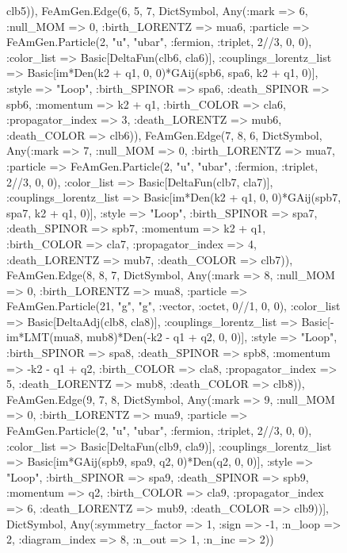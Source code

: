 \documentclass{revtex4}
\begin{document}
\begin{figure}[!htb]
\begin{center}
{clb5)), FeAmGen.Edge(6, 5, 7, Dict{Symbol, Any}(:mark => 6, :null_MOM => 0, :birth_LORENTZ => mua6, :particle => FeAmGen.Particle(2, "u", "ubar", :fermion, :triplet, 2//3, 0, 0), :color_list => Basic[DeltaFun(clb6, cla6)], :couplings_lorentz_list => Basic[im*Den(k2 + q1, 0, 0)*GAij(spb6, spa6, k2 + q1, 0)], :style => "Loop", :birth_SPINOR => spa6, :death_SPINOR => spb6, :momentum => k2 + q1, :birth_COLOR => cla6, :propagator_index => 3, :death_LORENTZ => mub6, :death_COLOR => clb6)), FeAmGen.Edge(7, 8, 6, Dict{Symbol, Any}(:mark => 7, :null_MOM => 0, :birth_LORENTZ => mua7, :particle => FeAmGen.Particle(2, "u", "ubar", :fermion, :triplet, 2//3, 0, 0), :color_list => Basic[DeltaFun(clb7, cla7)], :couplings_lorentz_list => Basic[im*Den(k2 + q1, 0, 0)*GAij(spb7, spa7, k2 + q1, 0)], :style => "Loop", :birth_SPINOR => spa7, :death_SPINOR => spb7, :momentum => k2 + q1, :birth_COLOR => cla7, :propagator_index => 4, :death_LORENTZ => mub7, :death_COLOR => clb7)), FeAmGen.Edge(8, 8, 7, Dict{Symbol, Any}(:mark => 8, :null_MOM => 0, :birth_LORENTZ => mua8, :particle => FeAmGen.Particle(21, "g", "g", :vector, :octet, 0//1, 0, 0), :color_list => Basic[DeltaAdj(clb8, cla8)], :couplings_lorentz_list => Basic[-im*LMT(mua8, mub8)*Den(-k2 - q1 + q2, 0, 0)], :style => "Loop", :birth_SPINOR => spa8, :death_SPINOR => spb8, :momentum => -k2 - q1 + q2, :birth_COLOR => cla8, :propagator_index => 5, :death_LORENTZ => mub8, :death_COLOR => clb8)), FeAmGen.Edge(9, 7, 8, Dict{Symbol, Any}(:mark => 9, :null_MOM => 0, :birth_LORENTZ => mua9, :particle => FeAmGen.Particle(2, "u", "ubar", :fermion, :triplet, 2//3, 0, 0), :color_list => Basic[DeltaFun(clb9, cla9)], :couplings_lorentz_list => Basic[im*GAij(spb9, spa9, q2, 0)*Den(q2, 0, 0)], :style => "Loop", :birth_SPINOR => spa9, :death_SPINOR => spb9, :momentum => q2, :birth_COLOR => cla9, :propagator_index => 6, :death_LORENTZ => mub9, :death_COLOR => clb9))], Dict{Symbol, Any}(:symmetry_factor => 1, :sign => -1, :n_loop => 2, :diagram_index => 8, :n_out => 1, :n_inc => 2)) 
}
\end{center}
\end{figure}
\end{document}
